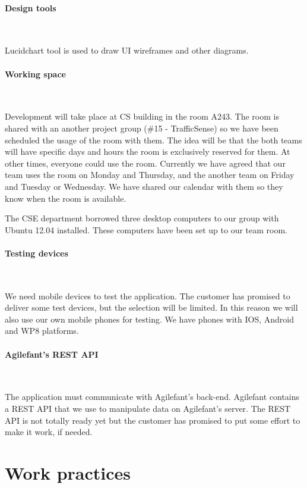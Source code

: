 \paragraph{Design tools}~

Lucidchart tool is used to draw UI wireframes and other diagrams.

\paragraph{Working space}~

Development will take place at CS building in the room A243. The room is shared
with an another project group (\#15 - TrafficSense) so we have been scheduled
the usage of the room with them. The idea will be that the both teams will have
specific days and hours the room is exclusively reserved for them. At other
times, everyone could use the room. Currently we have agreed that our team uses
the room on Monday and Thursday, and the another team on Friday and Tuesday or
Wednesday. We have shared our calendar with them so they know when the room is
available.

The CSE department borrowed three desktop computers to our group with Ubuntu
12.04 installed. These computers have been set up to our team room.

\paragraph{Testing devices}~

We need mobile devices to test the application. The customer has promised to
deliver some test devices, but the selection will be limited. In this reason we
will also use our own mobile phones for testing. We have phones with IOS,
Android and WP8 platforms.

\paragraph{Agilefant's REST API}~

The application must communicate with Agilefant's back-end. Agilefant contains a
REST API that we use to manipulate data on Agilefant's server. The REST API is
not totally ready yet but the customer has promised to put some effort to make
it work, if needed.

\section{Work practices}

